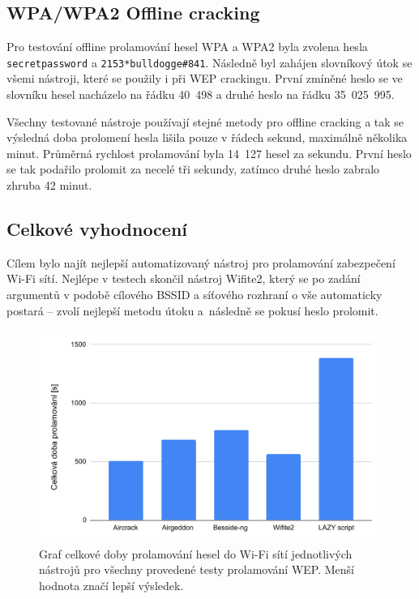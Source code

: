 \subsection{WPA/WPA2 Offline cracking}
Pro testování offline prolamování hesel WPA a WPA2 byla zvolena hesla \texttt{secretpassword} a \texttt{2153*bulldogge\#841}. Následně byl zahájen slovníkový útok se všemi nástroji, které se použily i při WEP crackingu. První zmíněné heslo se ve slovníku hesel nacházelo na řádku 40~498 a druhé heslo na řádku 35~025~995.

Všechny testované nástroje používají stejné metody pro offline cracking a tak se výsledná doba prolomení hesla lišila pouze v řádech sekund, maximálně několika minut. Průměrná rychlost prolamování byla 14~127 hesel za sekundu. První heslo se tak podařilo prolomit za necelé tři sekundy, zatímco druhé heslo zabralo zhruba 42 minut.

\subsection{Celkové vyhodnocení}
Cílem bylo najít nejlepší automatizovaný nástroj pro prolamování zabezpečení Wi-Fi sítí. Nejlépe v testech skončil nástroj Wifite2, který se po zadání argumentů v podobě cílového BSSID a síťového rozhraní o vše automaticky postará -- zvolí nejlepší metodu útoku a~následně se pokusí heslo prolomit. 

\begin{figure}[htbp]
  \centering
  \includegraphics[width=15cm]{obrazky-figures/porovnani-wep.pdf}
  \caption{Graf celkové doby prolamování hesel do Wi-Fi sítí jednotlivých nástrojů pro všechny provedené testy prolamování WEP. Menší hodnota značí lepší výsledek.}
  \label{img:wep-vysledky}
\end{figure}

